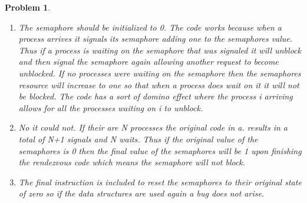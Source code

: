 \documentclass{article}
\theoremstyle{problemstyle}
\newtheorem{problem}{Problem}
\begin{document}
\begin{problem} ~
\begin{enumerate}[label=(\alph*)]
	\item The semaphore should be initialized to 0. The code works because when a process arrives it signals its semaphore adding one to the semaphores value. Thus if a process is waiting on the semaphore that was signaled it will unblock and then signal the semaphore again allowing another request to become unblocked. If no processes were waiting on the semaphore then the semaphores resource will increase to one so that when a process does wait on it it will not be blocked. The code has a sort of domino effect where the process i arriving allows for all the processes waiting on i to unblock.
	\item No it could not. If their are N processes the original code in a. results in a total of N+1 signals and N waits. Thus if the original value of the semaphores is 0 then the final value of the semaphores will be 1 upon finishing the rendezvous code which means the semaphore will not block.
	\item The final instruction is included to reset the semaphores to their original state of zero so if the data structures are used again a bug does not arise. 
\end{enumerate}
\end{problem}
\end{document}
